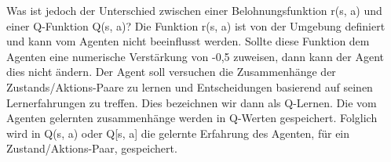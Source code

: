 Was ist jedoch der Unterschied zwischen einer Belohnungsfunktion r(s, a) und einer Q-Funktion Q(s, a)? Die Funktion r(s, a) ist von der Umgebung definiert und kann vom Agenten nicht beeinflusst werden. Sollte diese Funktion dem Agenten eine numerische Verstärkung von -0,5 zuweisen, dann kann der Agent dies nicht ändern. Der Agent soll versuchen die Zusammenhänge der Zustands/Aktions-Paare zu lernen und Entscheidungen basierend auf seinen Lernerfahrungen zu treffen. Dies bezeichnen wir dann als Q-Lernen. Die vom Agenten gelernten zusammenhänge werden in Q-Werten gespeichert. Folglich wird in Q(s, a) oder Q[s, a] die gelernte Erfahrung des Agenten, für ein Zustand/Aktions-Paar, gespeichert. \\
